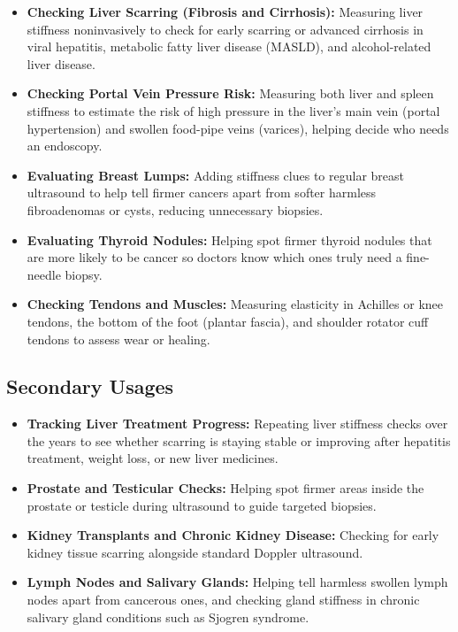 \begin{itemize}
    \item \textbf{Checking Liver Scarring (Fibrosis and Cirrhosis):} Measuring liver stiffness noninvasively to check for early scarring or advanced cirrhosis in viral hepatitis, metabolic fatty liver disease (MASLD), and alcohol-related liver disease.
    \item \textbf{Checking Portal Vein Pressure Risk:} Measuring both liver and spleen stiffness to estimate the risk of high pressure in the liver's main vein (portal hypertension) and swollen food-pipe veins (varices), helping decide who needs an endoscopy.
    \item \textbf{Evaluating Breast Lumps:} Adding stiffness clues to regular breast ultrasound to help tell firmer cancers apart from softer harmless fibroadenomas or cysts, reducing unnecessary biopsies.
    \item \textbf{Evaluating Thyroid Nodules:} Helping spot firmer thyroid nodules that are more likely to be cancer so doctors know which ones truly need a fine-needle biopsy.
    \item \textbf{Checking Tendons and Muscles:} Measuring elasticity in Achilles or knee tendons, the bottom of the foot (plantar fascia), and shoulder rotator cuff tendons to assess wear or healing.
\end{itemize}

\subsection{Secondary Usages}

\begin{itemize}
    \item \textbf{Tracking Liver Treatment Progress:} Repeating liver stiffness checks over the years to see whether scarring is staying stable or improving after hepatitis treatment, weight loss, or new liver medicines.
    \item \textbf{Prostate and Testicular Checks:} Helping spot firmer areas inside the prostate or testicle during ultrasound to guide targeted biopsies.
    \item \textbf{Kidney Transplants and Chronic Kidney Disease:} Checking for early kidney tissue scarring alongside standard Doppler ultrasound.
    \item \textbf{Lymph Nodes and Salivary Glands:} Helping tell harmless swollen lymph nodes apart from cancerous ones, and checking gland stiffness in chronic salivary gland conditions such as Sjogren syndrome.
\end{itemize}

